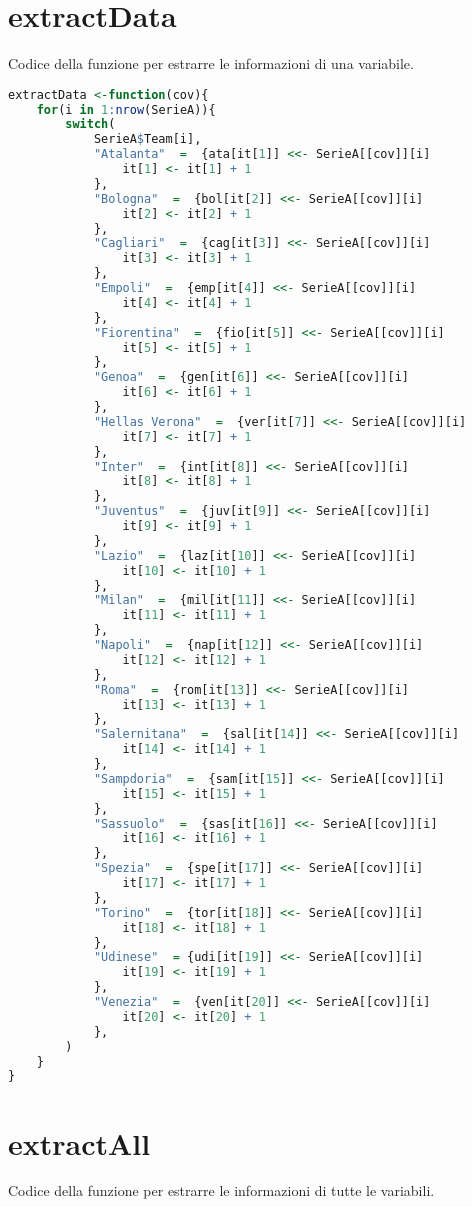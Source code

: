 \section{extractData}
\label{sez:Z1.1}
Codice della funzione per estrarre le informazioni di una variabile.

\begin{lstlisting}[language=R, caption={Codice per estrarre le informazioni di una variabile.}, captionpos=b, label=code:a5]
extractData <-function(cov){
	for(i in 1:nrow(SerieA)){
		switch(
			SerieA$Team[i],
			"Atalanta"  =  {ata[it[1]] <<- SerieA[[cov]][i]
				it[1] <- it[1] + 1                      
			},
			"Bologna"  =  {bol[it[2]] <<- SerieA[[cov]][i]
				it[2] <- it[2] + 1
			},       
			"Cagliari"  =  {cag[it[3]] <<- SerieA[[cov]][i]
				it[3] <- it[3] + 1
			},      
			"Empoli"  =  {emp[it[4]] <<- SerieA[[cov]][i]
				it[4] <- it[4] + 1
			},      
			"Fiorentina"  =  {fio[it[5]] <<- SerieA[[cov]][i]
				it[5] <- it[5] + 1
			},   
			"Genoa"  =  {gen[it[6]] <<- SerieA[[cov]][i]
				it[6] <- it[6] + 1
			},        
			"Hellas Verona"  =  {ver[it[7]] <<- SerieA[[cov]][i]
				it[7] <- it[7] + 1
			},
			"Inter"  =  {int[it[8]] <<- SerieA[[cov]][i]
				it[8] <- it[8] + 1
			},       
			"Juventus"  =  {juv[it[9]] <<- SerieA[[cov]][i]
				it[9] <- it[9] + 1
			},     
			"Lazio"  =  {laz[it[10]] <<- SerieA[[cov]][i]
				it[10] <- it[10] + 1
			},         
			"Milan"  =  {mil[it[11]] <<- SerieA[[cov]][i]
				it[11] <- it[11] + 1
			},         
			"Napoli"  =  {nap[it[12]] <<- SerieA[[cov]][i]
				it[12] <- it[12] + 1
			},        
			"Roma"  =  {rom[it[13]] <<- SerieA[[cov]][i]
				it[13] <- it[13] + 1
			},          
			"Salernitana"  =  {sal[it[14]] <<- SerieA[[cov]][i]
				it[14] <- it[14] + 1
			},   
			"Sampdoria"  =  {sam[it[15]] <<- SerieA[[cov]][i]
				it[15] <- it[15] + 1
			},     
			"Sassuolo"  =  {sas[it[16]] <<- SerieA[[cov]][i]
				it[16] <- it[16] + 1
			},     
			"Spezia"  =  {spe[it[17]] <<- SerieA[[cov]][i]
				it[17] <- it[17] + 1
			},        
			"Torino"  =  {tor[it[18]] <<- SerieA[[cov]][i]
				it[18] <- it[18] + 1
			},       
			"Udinese"  = {udi[it[19]] <<- SerieA[[cov]][i]
				it[19] <- it[19] + 1
			},       
			"Venezia"  =  {ven[it[20]] <<- SerieA[[cov]][i]
				it[20] <- it[20] + 1
			},     
		)
	}
}
\end{lstlisting}

\section{extractAll}
\label{sez:Z1.2}
Codice della funzione per estrarre le informazioni di tutte le variabili.

